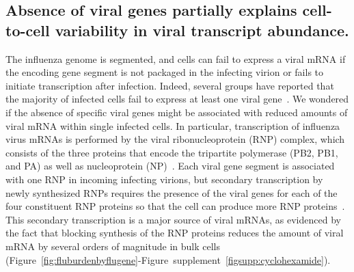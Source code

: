 \documentclass[9pt,lineno]{elife}
\begin{document}
\subsection{Absence of viral genes partially explains cell-to-cell variability in viral transcript abundance.}
The influenza genome is segmented, and cells can fail to express a viral mRNA if the encoding gene segment is not packaged in the infecting virion or fails to initiate transcription after infection.
Indeed, several groups have reported that the majority of infected cells fail to express at least one viral gene~\citep{Brooke:2013kb, Heldt:2015iz,Dou:2017cp}. 
We wondered if the absence of specific viral genes might be associated with reduced amounts of viral mRNA within single infected cells.
In particular, transcription of influenza virus mRNAs is performed by the viral ribonucleoprotein (RNP) complex, which consists of the three proteins that encode the tripartite polymerase (PB2, PB1, and PA) as well as nucleoprotein (NP)~\cite{huang1990determination}.
Each viral gene segment is associated with one RNP in incoming infecting virions, but secondary transcription by newly synthesized RNPs requires the presence of the viral genes for each of the four constituent RNP proteins so that the cell can produce more RNP proteins~\citep{Vreede:2004ip,eisfeld2015centre}.
This secondary transcription is a major source of viral mRNAs, as evidenced by the fact that blocking synthesis of the RNP proteins reduces the amount of viral mRNA by several orders of magnitude in bulk cells (Figure~\ref{fig:fluburdenbyflugene}-Figure~supplement~\ref{figsupp:cyclohexamide}).
\end{document}
